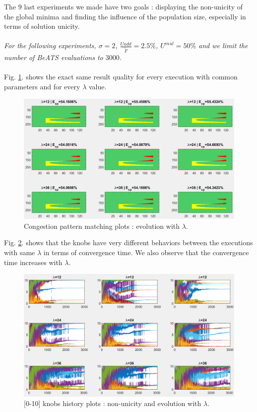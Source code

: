 The $9$ last experiments we made have two goals : displaying the non-unicity of the global minima and finding the influence of the population size, especially in terms of solution unicity.\\
\\
\emph{For the following experiments, $\sigma=2$, $\frac{U{add}}{\widetilde{F}}=2.5\% $, $U^{mul}=50\% $ and we limit the number of BeATS evaluations to $3000$.} \\
\\
Fig. \ref{fig:lambdacp}. shows the exact same result quality for every execution with common parameters and for every $\lambda$ value.\\
\begin{figure}[!h]
	\caption{Congestion pattern matching plots : evolution with $\lambda$.}
	\label{fig:lambdacp}
	\includegraphics[width=7in]{figures/results_figures/lambda/cp_lambda_all.png}
\end{figure}
\newpage
Fig. \ref{fig:lambdaknobs}. shows that the knobs have very different behaviors between the executions with same $\lambda$ in terms of convergence time. We also observe that the convergence time increases with $\lambda$.\\
\begin{figure}[!h]
	\caption{[0-10] knobs history plots : non-unicity and evolution with $\lambda$.}
	\label{fig:lambdaknobs}
	\includegraphics[width=7in]{figures/results_figures/lambda/knobs_lambda_all.png}
\end{figure}
